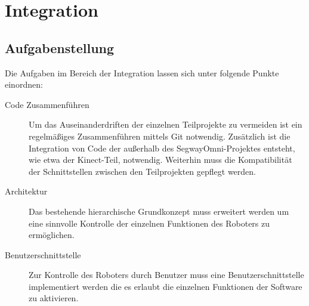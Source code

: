 
\chapter{Integration}
\label{integration_cha}
\authorsection{\editorjulian}

\section{Aufgabenstellung}
\label{aufgabenstellung_integration_sec}


Die Aufgaben im Bereich der Integration lassen sich unter folgende Punkte einordnen:

\begin{description}
\item[Code Zusammenführen]
Um das Auseinanderdriften der einzelnen Teilprojekte zu vermeiden ist ein regelmäßiges Zusammenführen mittels Git notwendig. Zusätzlich ist die Integration von Code der außerhalb des SegwayOmni-Projektes entsteht, wie etwa der Kinect-Teil, notwendig. Weiterhin muss die Kompatibilität der Schnittstellen zwischen den Teilprojekten gepflegt werden.

\item[Architektur]
Das bestehende hierarchische Grundkonzept muss erweitert werden um eine sinnvolle Kontrolle der einzelnen Funktionen des Roboters zu ermöglichen.

\item[Benutzerschnittstelle]
Zur Kontrolle des Roboters durch Benutzer muss eine Benutzerschnittstelle implementiert werden die es erlaubt die einzelnen Funktionen der Software zu aktivieren.

\end{description}


